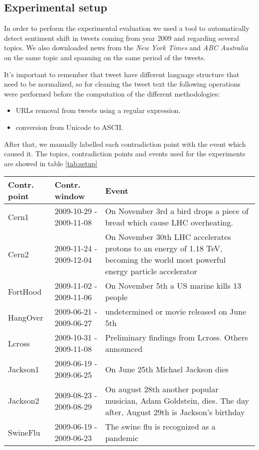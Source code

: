 \subsection*{Experimental setup}
In order to perform the experimental evaluation we used a tool to automatically
detect sentiment shift in tweets coming from year 2009 and regarding several
topics. We also downloaded news from the \emph{New York Times} and \emph{ABC
Australia} on the same topic and spanning on the same period of the tweets.

It's important to remember that tweet have different language structure that need to be normalized, so for cleaning the tweet text the following operations were performed before the computation of the different methodologies:
\begin{itemize}
	\item URLs removal from tweets using a regular expression.
	\item conversion from Unicode to ASCII.
\end{itemize}

After that, we manually labelled each contradiction point with the event which
caused it. The topics, contradiction points and events used for the experiments
are showed in table \ref{tab:setup}

\begin{table*}
	\centering
	\begin{tabularx}{\textwidth}{|l|l|X|}
	\hline
	Contr. point 	& Contr. window 			& Event \\
	\hline 
	Cern1			& 2009-10-29 - 2009-11-08 	& On November 3rd a bird drops a
piece of bread which cause LHC overheating. \\
	Cern2			& 2009-11-24 - 2009-12-04	& On November 30th LHC accelerates protons to an
energy of 1.18 TeV, becoming the world most powerful energy particle
accelerator\\
	FortHood 		& 2009-11-02 - 2009-11-06	& On November 5th a US marine
kills 13 people\\
	HangOver		& 2009-06-21 - 2009-06-27	& undetermined or movie released
	on June 5th\\
	Lcross			& 2009-10-31 - 2009-11-08	& Preliminary findings from
	Lcross. Others announced\\
	Jackson1		& 2009-06-19 - 2009-06-25	& On June 25th Michael Jackson
dies\\
	Jackson2		& 2009-08-23 - 2009-08-29	& On august 28th another popular
musician, Adam Goldstein, dies. The day after, August 29th is Jackson's
birthday\\
	SwineFlu		& 2009-06-19 - 2009-06-23	& The swine flu is recognized as
	a pandemic\\
	\hline
	\end{tabularx}
	\caption{Contradiction points used for experimental evaluation}
	\label{tab:setup}
\end{table*}

